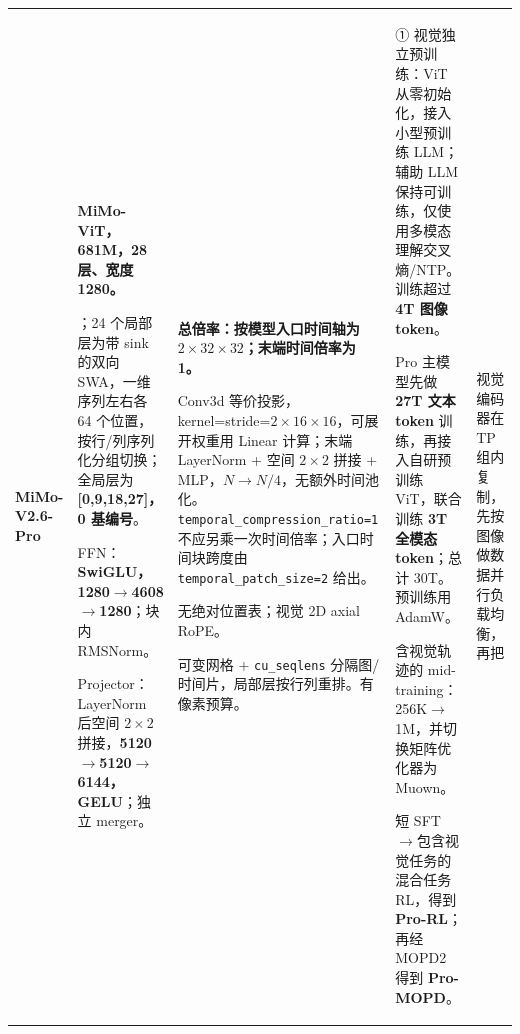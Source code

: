 \begin{longtable}{@{}P{0.130\dimexpr\textwidth-40pt\relax}P{0.235\dimexpr\textwidth-40pt\relax}P{0.300\dimexpr\textwidth-40pt\relax}P{0.245\dimexpr\textwidth-40pt\relax}P{0.090\dimexpr\textwidth-40pt\relax}@{}}
{\bfseries MiMo-\allowbreak{}V2.\allowbreak{}6-\allowbreak{}Pro} & {\bfseries MiMo-\allowbreak{}ViT，681M，28 层、宽度 1280。}\par{}；24 个局部层为带 sink 的双向 SWA，一维序列左右各 64 个位置，按行/\allowbreak{}列序列化分组切换；全局层为 {\bfseries [0,9,18,27]，0 基编号}。\par\vspace{1pt}FFN：{\bfseries SwiGLU，1280\(\rightarrow\)4608\(\rightarrow\)1280}；块内 RMSNorm。\par\vspace{1pt}Projector：LayerNorm 后空间 \(2\times 2\) 拼接，{\bfseries 5120\(\rightarrow\)5120\(\rightarrow\)6144，GELU}；独立 merger。 & {\bfseries 总倍率：按模型入口时间轴为 \(2\times 32\times 32\)；末端时间倍率为 1。}\par{}Conv3d 等价投影，kernel=\allowbreak{}stride=\allowbreak{}\(2\times 16\times 16\)，可展开权重用 Linear 计算；末端 LayerNorm + 空间 \(2\times 2\) 拼接 + MLP，{\bfseries \(N\rightarrow N/4\)}，无额外时间池化。\texttt{temporal\_\allowbreak{}compression\_\allowbreak{}ratio=\allowbreak{}1} 不应另乘一次时间倍率；入口时间块跨度由 \texttt{temporal\_\allowbreak{}patch\_\allowbreak{}size=\allowbreak{}2} 给出。\par\vspace{1pt}{\bfseries 位置：}无绝对位置表；视觉 2D axial RoPE。\par\vspace{1pt}{\bfseries 动态分辨率：是。} 可变网格 + \texttt{cu\_\allowbreak{}seqlens} 分隔图/\allowbreak{}时间片，局部层按行列重排。有像素预算。 & {①} 视觉独立预训练：ViT 从零初始化，接入小型预训练 LLM；辅助 LLM 保持可训练，仅使用多模态理解交叉熵/\allowbreak{}NTP。训练超过 {\bfseries 4T 图像 token}。\par{} Pro 主模型先做 {\bfseries 27T 文本 token} 训练，再接入自研预训练 ViT，联合训练 {\bfseries 3T 全模态 token}；总计 30T。预训练用 AdamW。\par{} 含视觉轨迹的 mid-\allowbreak{}training：256K\(\rightarrow\)1M，并切换矩阵优化器为 Muown。\par{} 短 SFT\(\rightarrow\)包含视觉任务的混合任务 RL，得到 {\bfseries Pro-\allowbreak{}RL}；再经 MOPD2 得到 {\bfseries Pro-\allowbreak{}MOPD}。 & 视觉编码器在 TP 组内复制，先按图像做数据并行负载均衡，再把 
\end{longtable}
